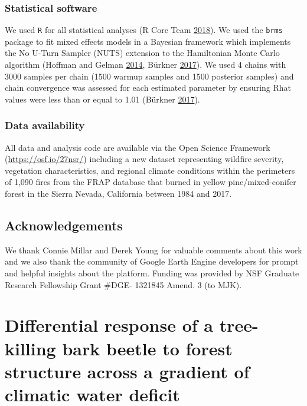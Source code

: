 \documentclass[twoside,12pt,final]{ucthesis-CA2012}
\begin{document}
\begin{ucmainmatter}
\subsection{Statistical software}\label{statistical-software}

We used \texttt{R} for all statistical analyses (R Core Team
\protect\hyperlink{ref-rcoreteam2018}{2018}). We used the \texttt{brms}
package to fit mixed effects models in a Bayesian framework which
implements the No U-Turn Sampler (NUTS) extension to the Hamiltonian
Monte Carlo algorithm (Hoffman and Gelman
\protect\hyperlink{ref-hoffman2014}{2014}, Bürkner
\protect\hyperlink{ref-burkner2017}{2017}). We used 4 chains with 3000
samples per chain (1500 warmup samples and 1500 posterior samples) and
chain convergence was assessed for each estimated parameter by ensuring
Rhat values were less than or equal to 1.01 (Bürkner
\protect\hyperlink{ref-burkner2017}{2017}).

\subsection{Data availability}\label{data-availability}

All data and analysis code are available via the Open Science Framework
(\url{https://osf.io/27nsr/}) including a new dataset representing
wildfire severity, vegetation characteristics, and regional climate
conditions within the perimeters of 1,090 fires from the FRAP database
that burned in yellow pine/mixed-conifer forest in the Sierra Nevada,
California between 1984 and 2017.

\section{Acknowledgements}\label{acknowledgements}

We thank Connie Millar and Derek Young for valuable comments about this
work and we also thank the community of Google Earth Engine developers
for prompt and helpful insights about the platform. Funding was provided
by NSF Graduate Research Fellowship Grant \#DGE- 1321845 Amend. 3 (to
MJK).

\chapter{Differential response of a tree-killing bark beetle to forest
structure across a gradient of climatic water
deficit}\label{differential-response-of-a-tree-killing-bark-beetle-to-forest-structure-across-a-gradient-of-climatic-water-deficit}


\end{ucmainmatter}
\end{document}
